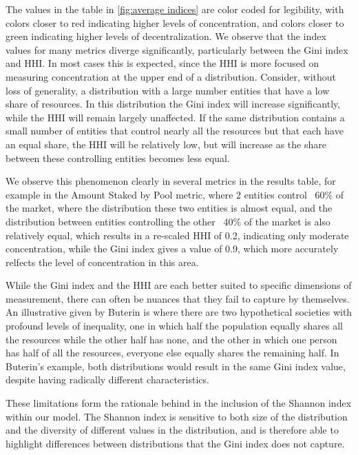 \documentclass[conference]{IEEEtran}
\begin{document}
The values in the table in \ref{fig:average indices} are color coded for legibility, with colors closer to red indicating higher levels of concentration, and colors closer to green indicating higher levels of decentralization. We observe that the index values for many metrics diverge significantly, particularly between the Gini index and HHI.  In most cases this is expected, since the HHI is more focused on measuring concentration at the upper end of a distribution. Consider, without loss of generality, a distribution with a large number entities that have a low share of resources. In this distribution the Gini index will increase significantly, while the HHI will remain largely unaffected.  If the same distribution contains a small number of entities that control nearly all the resources but that each have an equal share, the HHI will be relatively low, but will increase as the share between these controlling entities becomes less equal. 

We observe this phenomenon clearly in several metrics in the results table, for example in the Amount Staked by Pool metric, where 2 entities control ~60\% of the market, where the distribution these two entities is almost equal, and the distribution between entities controlling the other ~40\% of the market is also relatively equal, which results in a re-scaled HHI of 0.2, indicating only moderate concentration, while the Gini index gives a value of 0.9, which more accurately relfects the level of concentration in this area.

While the Gini index and the HHI are each better suited to specific dimensions of measurement, there can often be nuances that they fail to capture by themselves.  An illustrative given by Buterin \cite{buterin2022b} is where there are two hypothetical societies with profound levels of inequality, one in which half the population equally shares all the resources while the other half has none, and the other in which one person has half of all the resources, everyone else equally shares the remaining half.  In Buterin's example, both distributions would result in the same Gini index value, despite having radically different characteristics.

These limitations form the rationale behind in the inclusion of the Shannon index within our model.  The Shannon index is sensitive to both size of the distribution and the diversity of different values in the distribution, and is therefore able to highlight differences between distributions that the Gini index does not capture.
\end{document}
